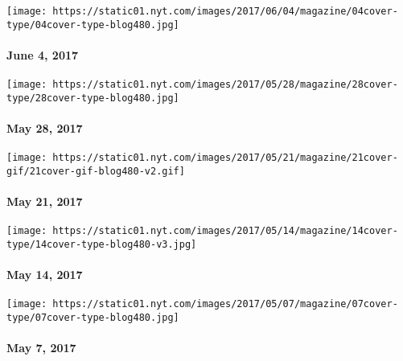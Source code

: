 \href{https://www.nytimes.com/issue/magazine/2017/06/02/magazine-index-20170604}{}

\texttt{[image: https://static01.nyt.com/images/2017/06/04/magazine/04cover-type/04cover-type-blog480.jpg]}

\hypertarget{june-4-2017}{%
\paragraph{June 4, 2017}\label{june-4-2017}}

\href{https://www.nytimes.com/issue/magazine/2017/05/26/magazine-index-20170528}{}

\texttt{[image: https://static01.nyt.com/images/2017/05/28/magazine/28cover-type/28cover-type-blog480.jpg]}

\hypertarget{may-28-2017}{%
\paragraph{May 28, 2017}\label{may-28-2017}}

\href{https://www.nytimes.com/issue/magazine/2017/05/19/magazine-index-20170521}{}

\texttt{[image: https://static01.nyt.com/images/2017/05/21/magazine/21cover-gif/21cover-gif-blog480-v2.gif]}

\hypertarget{may-21-2017}{%
\paragraph{May 21, 2017}\label{may-21-2017}}

\href{https://www.nytimes.com/issue/magazine/2017/05/12/the-51417-issue-20170514}{}

\texttt{[image: https://static01.nyt.com/images/2017/05/14/magazine/14cover-type/14cover-type-blog480-v3.jpg]}

\hypertarget{may-14-2017}{%
\paragraph{May 14, 2017}\label{may-14-2017}}

\href{https://www.nytimes.com/issue/magazine/2017/05/05/magazine-index-20170507}{}

\texttt{[image: https://static01.nyt.com/images/2017/05/07/magazine/07cover-type/07cover-type-blog480.jpg]}

\hypertarget{may-7-2017}{%
\paragraph{May 7, 2017}\label{may-7-2017}}

